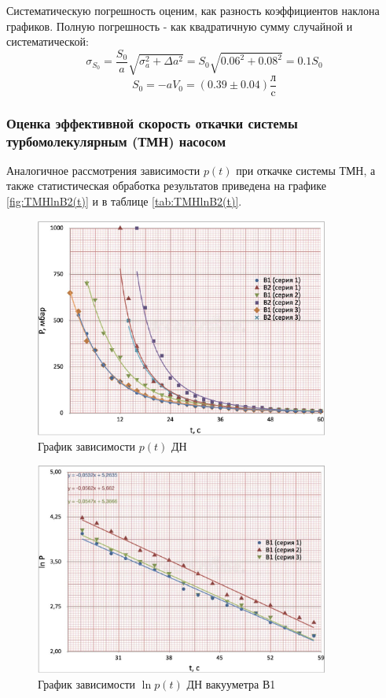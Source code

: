 \documentclass[12pt,a4paper]{article}
\begin{document}
Систематическую погрешность оценим, как разность коэффициентов наклона графиков. Полную погрешность - как квадратичную сумму случайной и систематической:
$$	\sigma_{S_0} = \frac{S_0}{a}\sqrt{\sigma_{a}^2 + \Delta a^2} = S_0 \sqrt{0.06^2 + 0.08^2} = 0.1 S_0$$
$$S_0 = -a V_0 = (0.39 \pm 0.04) \frac{\text{л}}{\text{c}}$$

\subsubsection*{Оценка эффективной скорость откачки системы турбомолекулярным (ТМН) насосом}
Аналогичное рассмотрения зависимости $p(t)$ при откачке системы ТМН, а также статистическая обработка результатов приведена на графике \ref{fig:TMHlnB2(t)} и в таблице \ref{tab:TMHlnB2(t)}. 


\begin{figure}[h]
	\centering
		\includegraphics[width = 0.86\textwidth]{res/p(t).pdf}
	\caption{График зависимости $p(t)$ ДН}
	\label{fig:p(t)}
\end{figure}

\begin{figure}[H]
	\centering
	\includegraphics[width = 0.86\textwidth]{res/lnB1(t).pdf}
	\caption{График зависимости $\ln{p}(t)$ ДН вакууметра В1}
	\label{fig:lnB1(t)}
\end{figure}
\end{document}
